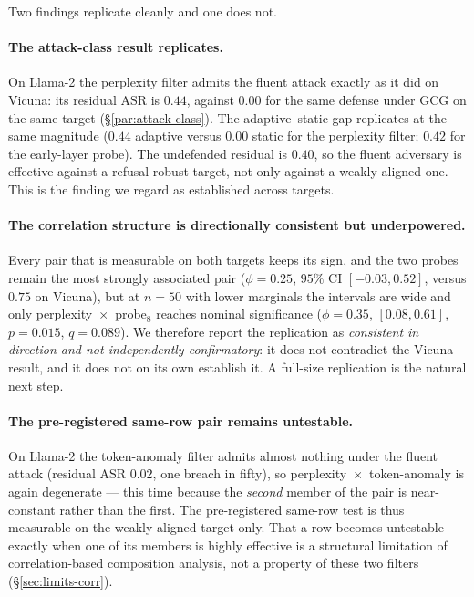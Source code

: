 Two findings replicate cleanly and one does not.

\paragraph{The attack-class result replicates.}
On Llama-2 the perplexity filter admits the fluent attack exactly as it did on Vicuna: its
residual ASR is $0.44$, against $0.00$ for the same defense under GCG on the same target
(\S\ref{par:attack-class}). The adaptive--static gap replicates at the same magnitude
($0.44$ adaptive versus $0.00$ static for the perplexity filter; $0.42$ for the early-layer
probe). The undefended residual is $0.40$, so the fluent adversary is effective against a
refusal-robust target, not only against a weakly aligned one. This is the finding we regard
as established across targets.

\paragraph{The correlation structure is directionally consistent but underpowered.}
Every pair that is measurable on both targets keeps its sign, and the two probes remain the
most strongly associated pair ($\phi=0.25$, $95\%$ CI $[-0.03,0.52]$, versus $0.75$ on
Vicuna), but at $n=50$ with lower marginals the intervals are wide and only
perplexity~$\times$~probe$_{8}$ reaches nominal significance ($\phi=0.35$, $[0.08,0.61]$,
$p=0.015$, $q=0.089$). We therefore report the replication as \emph{consistent in direction
and not independently confirmatory}: it does not contradict the Vicuna result, and it does
not on its own establish it. A full-size replication is the natural next step.

\paragraph{The pre-registered same-row pair remains untestable.}
On Llama-2 the token-anomaly filter admits almost nothing under the fluent attack (residual
ASR $0.02$, one breach in fifty), so perplexity~$\times$~token-anomaly is again degenerate
--- this time because the \emph{second} member of the pair is near-constant rather than the
first. The pre-registered same-row test is thus measurable on the weakly aligned target only.
That a row becomes untestable exactly when one of its members is highly effective is a
structural limitation of correlation-based composition analysis, not a property of these two
filters (\S\ref{sec:limits-corr}).

